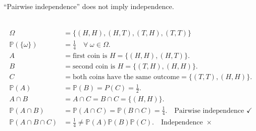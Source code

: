 \begin{remark}[Caution]
    ``Pairwise independence'' does not imply independence.
\end{remark} 

\begin{example} ~\vspace*{-1.5\baselineskip}
    \begin{align*}
        \Omega &= \{(H, H), (H, T), (T, H), (T, T)\} \\
        \mathbb{P}(\{\omega\}) &= \frac{1}{4} \quad \forall \; \omega \in \Omega. \\
        A &= \text{first coin is $H$} = \{(H, H), (H, T)\}. \\
        B &= \text{second coin is $H$} = \{(T, H), (H, H)\}. \\
        C &= \text{both coins have the same outcome} = \{(T, T), (H, H)\}. \\
        \mathbb{P}(A) &= \mathbb{P}(B) = P(C) = \frac{1}{2}. \\
        A \cap B &= A \cap C = B \cap C = \{(H, H)\}. \\
        \mathbb{P}(A \cap B) &= \mathbb{P}(A \cap C) = \mathbb{P}(B \cap C) = \frac{1}{4}. \quad \text{Pairwise independence } \checkmark \\
        \mathbb{P}(A \cap B \cap C) &= \frac{1}{4} \neq \mathbb{P}(A) \mathbb{P}(B) \mathbb{P}(C). \quad \text{Independence } \times
    \end{align*} 
\end{example} 

